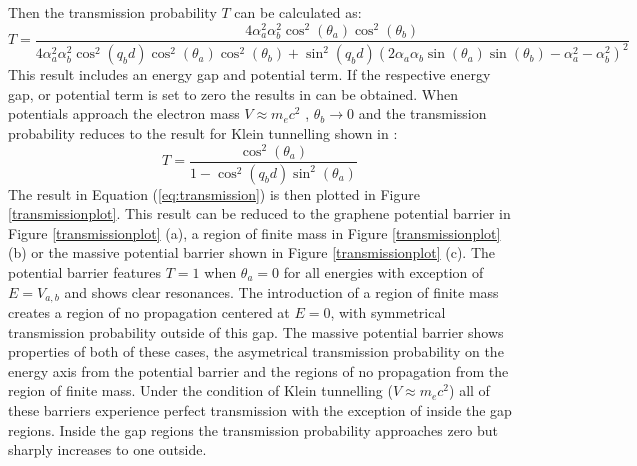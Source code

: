 				Then the transmission probability $T$ can be calculated as:
				\begin{equation}
					T=\frac{4\alpha_{a}^{2}\alpha_{b}^{2}\cos^{2}(\theta_{a})\cos^{2}(\theta_{b})}{4\alpha_{a}^{2}\alpha_{b}^{2}\cos^{2}(q_{b}d)\cos^{2}(\theta_{a})\cos^{2}(\theta_{b})+\sin^{2}(q_{b}d)\left(2\alpha_{a}\alpha_{b}\sin(\theta_{a})\sin(\theta_{b})-\alpha_{a}^{2}-\alpha_{b}^{2}\right)^{2}}
					\label{eq:transmission}
				\end{equation}
				This result includes an energy gap and potential term. If the respective energy gap, or potential term is set to zero the results in \cite{b1} can be obtained. When potentials approach the electron mass $V \approx m_{e}c^{2}$ \cite{b49}, $\theta_{b}\rightarrow 0$ and the transmission probability reduces to the result for Klein tunnelling shown in \cite{b12}:
				\begin{equation}
					T=\frac{\cos^{2}(\theta_{a})}{1-\cos^{2}(q_{b}d)\sin^{2}(\theta_{a})}
					\label{t2}
				\end{equation}
				The result in Equation (\ref{eq:transmission}) is then plotted in Figure \ref{transmissionplot}. This result can be reduced to the graphene potential barrier in Figure \ref{transmissionplot} (a), a region of finite mass in Figure \ref{transmissionplot} (b) or the massive potential barrier shown in Figure \ref{transmissionplot} (c). The potential barrier features $T=1$ when $\theta_{a}=0$ for all energies with exception of $E=V_{a,b}$ and shows clear resonances. The introduction of a region of finite mass creates a region of no propagation centered at $E=0$, with symmetrical transmission probability outside of this gap. The massive potential barrier shows properties of both of these cases, the asymetrical transmission probability on the energy axis from the potential barrier and the regions of no propagation from the region of finite mass. Under the condition of Klein tunnelling ($V\approx m_{e}c^{2}$) all of these barriers experience perfect transmission with the exception of inside the gap regions. Inside the gap regions the transmission probability approaches zero but sharply increases to one outside.
